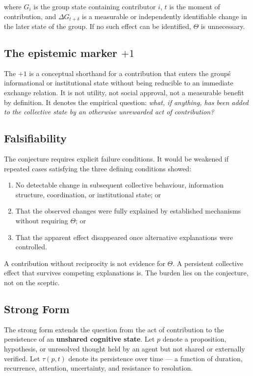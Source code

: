 \documentclass[10pt,twocolumn]{article}
\begin{document}
where $G_i$ is the group state containing contributor $i$, $t$ is the moment of contribution, and $\Delta G_{t+\delta}$ is a measurable or independently identifiable change in the later state of the group. If no such effect can be identified, $\Theta$ is unnecessary.

\subsection*{The epistemic marker $+1$}

The $+1$ is a conceptual shorthand for a contribution that enters the group\'s informational or institutional state without being reducible to an immediate exchange relation. It is not utility, not social approval, not a measurable benefit by definition. It denotes the empirical question: \emph{what, if anything, has been added to the collective state by an otherwise unrewarded act of contribution?}

\subsection*{Falsifiability}

The conjecture requires explicit failure conditions. It would be weakened if repeated cases satisfying the three defining conditions showed:

\begin{enumerate}
    \item No detectable change in subsequent collective behaviour, information structure, coordination, or institutional state; or
    \item That the observed changes were fully explained by established mechanisms without requiring $\Theta$; or
    \item That the apparent effect disappeared once alternative explanations were controlled.
\end{enumerate}

A contribution without reciprocity is not evidence for $\Theta$. A persistent collective effect that survives competing explanations is. The burden lies on the conjecture, not on the sceptic.

\subsection*{Strong Form}

The strong form extends the question from the act of contribution to the persistence of an \textbf{unshared cognitive state}. Let $p$ denote a proposition, hypothesis, or unresolved thought held by an agent but not shared or externally verified. Let $\tau(p,t)$ denote its persistence over time --- a function of duration, recurrence, attention, uncertainty, and resistance to resolution.
\end{document}
